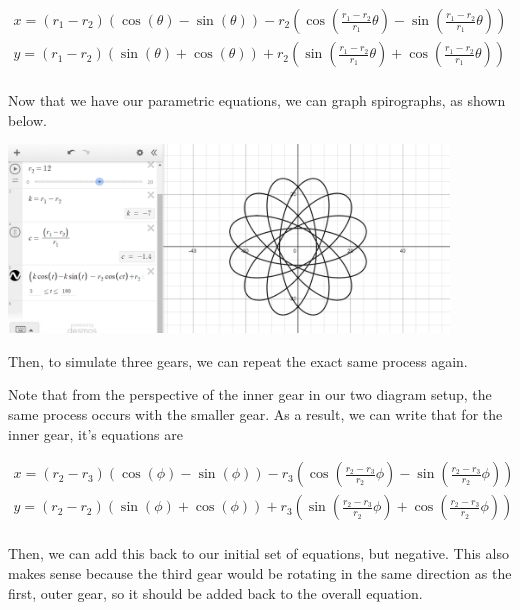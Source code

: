 \documentclass{article}
\begin{document}
\begin{align*}
    x = (r_1 - r_2) (\cos(\theta) - \sin(\theta)) - r_2  \left( \cos\left(\frac{r_1 - r_2}{r_1}  \theta \right) - \sin\left(\frac{r_1 - r_2}{r_1}  \theta \right) \right) \\
    y = (r_1 - r_2) \left(\sin(\theta) + \cos(\theta) \right) + r_2 \left(\sin\left(\frac{r_1 - r_2}{r_1}  \theta \right) + \cos\left(\frac{r_1 - r_2}{r_1}  \theta \right) \right) \\
\end{align*}

Now that we have our parametric equations, we can graph spirographs, as shown below.

\begin{center}
\includegraphics[height=5cm]{images/Spirograph.png}
\end{center}

Then, to simulate three gears, we can repeat the exact same process again. 

Note that from the perspective of the inner gear in our two diagram setup, the same process occurs with the smaller gear. As a result, we can write that for the inner gear, it's equations are 

\begin{align*}
    x = (r_2 - r_3) (\cos(\phi) - \sin(\phi)) - r_3  \left( \cos\left(\frac{r_2 - r_3}{r_2}  \phi \right) - \sin\left(\frac{r_2 - r_3}{r_2}  \phi \right) \right) \\
    y = (r_2 - r_2) \left(\sin(\phi) + \cos(\phi) \right) + r_3 \left(\sin\left(\frac{r_2 - r_3}{r_2}  \phi \right) + \cos\left(\frac{r_2 - r_3}{r_2}  \phi \right) \right) \\
\end{align*}

Then, we can add this back to our initial set of equations, but negative. This also makes sense because the third gear would be rotating in the same direction as the first, outer gear, so it should be added back to the overall equation. 
\end{document}
